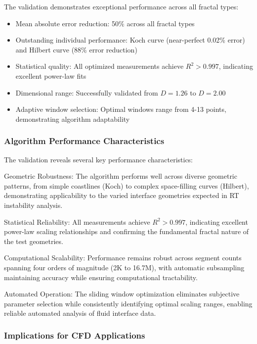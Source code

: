 \documentclass[preprint,12pt]{elsarticle}
\def\textbf#1{#1}%
\begin{document}
The validation demonstrates exceptional performance across all fractal types:

\begin{itemize}
\item \textbf{Mean absolute error reduction}: 50\% across all fractal types
\item \textbf{Outstanding individual performance}: Koch curve (near-perfect 0.02\% error) and Hilbert curve (88\% error reduction)
\item \textbf{Statistical quality}: All optimized measurements achieve $R^2 > 0.997$, indicating excellent power-law fits
\item \textbf{Dimensional range}: Successfully validated from $D = 1.26$ to $D = 2.00$
\item \textbf{Adaptive window selection}: Optimal windows range from 4-13 points, demonstrating algorithm adaptability
\end{itemize}

\subsubsection{Algorithm Performance Characteristics}

The validation reveals several key performance characteristics:

\textbf{Geometric Robustness}: The algorithm performs well across diverse geometric patterns, from simple coastlines (Koch) to complex space-filling curves (Hilbert), demonstrating applicability to the varied interface geometries expected in RT instability analysis.

\textbf{Statistical Reliability}: All measurements achieve $R^2 > 0.997$, indicating excellent power-law scaling relationships and confirming the fundamental fractal nature of the test geometries.

\textbf{Computational Scalability}: Performance remains robust across segment counts spanning four orders of magnitude (2K to 16.7M), with automatic subsampling maintaining accuracy while ensuring computational tractability.

\textbf{Automated Operation}: The sliding window optimization eliminates subjective parameter selection while consistently identifying optimal scaling ranges, enabling reliable automated analysis of fluid interface data.

\subsubsection{Implications for CFD Applications}
\end{document}
